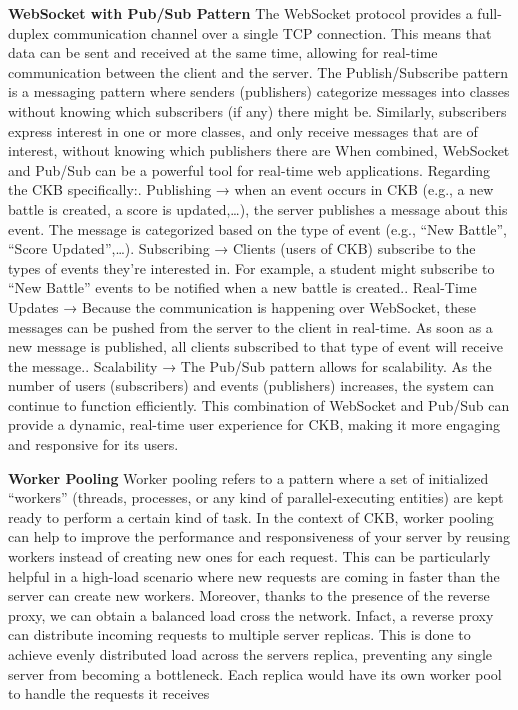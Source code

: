 \textbf{WebSocket with Pub/Sub Pattern}
The WebSocket protocol provides a full-duplex communication channel over a single TCP connection. 
This means that data can be sent and received at the same time, allowing for real-time communication between the client and the server.
The Publish/Subscribe pattern is a messaging pattern where senders (publishers) categorize messages into classes without knowing which 
subscribers (if any) there might be. Similarly, subscribers express interest in one or more classes, and only receive messages that are of interest, 
without knowing which publishers there are
When combined, WebSocket and Pub/Sub can be a powerful tool for real-time web applications. Regarding the CKB specifically:. Publishing → when an event occurs in CKB (e.g., a new battle is created, a score is updated,…), the server publishes a message about this event. 
The message is categorized based on the type of event (e.g., “New Battle”, “Score Updated”,…). Subscribing → Clients (users of CKB) subscribe to the types of events they’re interested in. 
For example, a student might subscribe to “New Battle” events to be notified when a new battle is created.. Real-Time Updates → Because the communication is happening over WebSocket, these messages can be pushed from the 
server to the client in real-time. As soon as a new message is published, all clients subscribed to that type of event will receive the message.. Scalability → The Pub/Sub pattern allows for scalability. As the number of users (subscribers) and events (publishers) increases, 
the system can continue to function efficiently.\newline
This combination of WebSocket and Pub/Sub can provide a dynamic, real-time user experience for CKB, making it more engaging and responsive for its users.

\textbf{Worker Pooling}
Worker pooling refers to a pattern where a set of initialized “workers” (threads, processes, or any kind of parallel-executing entities) 
are kept ready to perform a certain kind of task. In the context of CKB, worker pooling can help to improve the performance and 
responsiveness of your server by reusing workers instead of creating new ones for each request. This can be particularly helpful in 
a high-load scenario where new requests are coming in faster than the server can create new workers. 
Moreover, thanks to the presence of the reverse proxy, we can obtain a balanced load cross the network. 
Infact, a reverse proxy can distribute incoming requests to multiple server replicas. 
This is done to achieve evenly distributed load across the servers replica, 
preventing any single server from becoming a bottleneck. 
Each replica would have its own worker pool to handle the requests it receives

